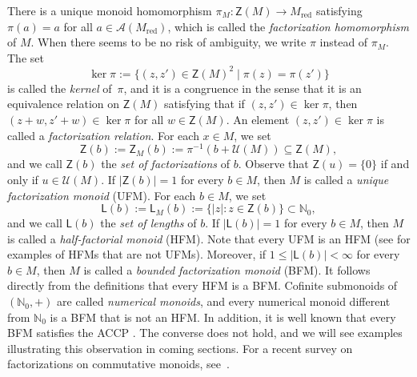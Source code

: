 \documentclass[12pt]{amsart}
\theoremstyle{definition}
\numberwithin{equation}{section}
\newcommand{\nn}{\mathbb{N}}
\newcommand{\ii}{\mathcal{A}}
\newcommand{\uu}{\mathcal{U}}
\begin{document}
There is a  unique monoid homomorphism $\pi_M \colon \mathsf{Z}(M) \to M_{\text{red}}$ satisfying $\pi(a) = a$ for all $a \in \ii(M_{\text{red}})$, which is called the \emph{factorization homomorphism} of $M$. %
When there seems to be no risk of ambiguity, we write $\pi$ instead of $\pi_M$. The set
\[
	\ker \pi := \{(z,z') \in \mathsf{Z}(M)^2 \mid \pi(z) = \pi(z') \}
\]
is called the \emph{kernel} of~$\pi$, and it is a congruence in the sense that it is an equivalence relation on $\mathsf{Z}(M)$ satisfying that if $(z,z') \in \ker \pi$, then $(z+w, z'+w) \in \ker \pi$ for all $w \in \mathsf{Z}(M)$. An element $(z,z') \in \ker \pi$ is called a \emph{factorization relation}. For each $x \in M$, we set
\[
	\mathsf{Z}(b) := \mathsf{Z}_M(b) := \pi^{-1}(b + \uu(M)) \subseteq \mathsf{Z}(M),
\]
and we call $\mathsf{Z}(b)$ the \emph{set of factorizations} of $b$. Observe that $\mathsf{Z}(u) = \{0\}$ if and only if $u \in \uu(M)$. If $|\mathsf{Z}(b)| = 1$ for every $b \in M$, then $M$ is called a \emph{unique factorization monoid} (UFM). For each $b \in M$, we set
\[
	\mathsf{L}(b) := \mathsf{L}_M(b) := \{|z| : z \in \mathsf{Z}(b)\} \subset \nn_0,
\]
and we call $\mathsf{L}(b)$ the \emph{set of lengths} of $b$. If $|\mathsf{L}(b)| = 1$ for every $b \in M$, then $M$ is called a \emph{half-factorial monoid} (HFM). Note that every UFM is an HFM (see \cite{sC14} for examples of HFMs that are not UFMs). Moreover, if $1 \le |\mathsf{L}(b)| < \infty$ for every $b \in M$, then $M$ is called a \emph{bounded factorization monoid} (BFM). It follows directly from the definitions that every HFM is a BFM. Cofinite submonoids of $(\nn_0,+)$ are called \emph{numerical monoids}, and every numerical monoid different from $\nn_0$ is a BFM that is not an HFM. In addition, it is well known that every BFM satisfies the ACCP \cite[Corollary~1]{fHK92}. The converse does not hold, and we will see examples illustrating this observation in coming sections. For a recent survey on factorizations on commutative monoids, see~\cite{GZ20}.
\end{document}
